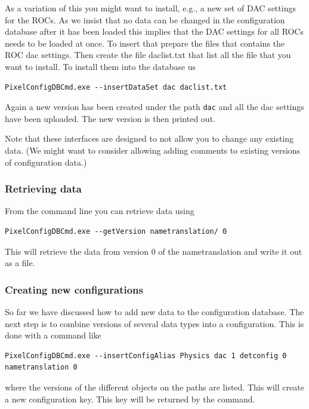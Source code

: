 As a variation of this you might want to install, e.g., a new set of 
DAC settings for the ROCs. As we insist that no data can be 
changed in the configuration database after it has been loaded
this implies that the DAC settings for all ROCs needs to be
loaded at once. To insert that prepare the files that contains the
ROC dac settings. Then create the file daclist.txt that list all
the file that you want to install. To install them into the
database us

\begin{verbatim}
PixelConfigDBCmd.exe --insertDataSet dac daclist.txt
\end{verbatim}

Again a new version has been created under the path {\tt dac} and
all the dac settings have been uploaded. The new version is then
printed out.

Note that these interfaces are designed to not allow
you to change any existing data. (We might want to consider allowing
adding comments to existing versions of configuration data.)

\subsubsection{Retrieving data}

From the command line you can retrieve data using
\begin{verbatim}
PixelConfigDBCmd.exe --getVersion nametranslation/ 0
\end{verbatim}
This will retrieve the data from version 0 of the nametranslation 
and write it out as a file.

\subsubsection{Creating new configurations}

So far we have discussed how to add new data to the configuration
database. The next step is to combine versions of several 
data types into a configuration. This is done with a command 
like

\begin{verbatim}
PixelConfigDBCmd.exe --insertConfigAlias Physics dac 1 detconfig 0 nametranslation 0
\end{verbatim}

where the versions of the different objects on the paths are 
listed. This will create a new configuration key. This key will
be returned by the command. 

